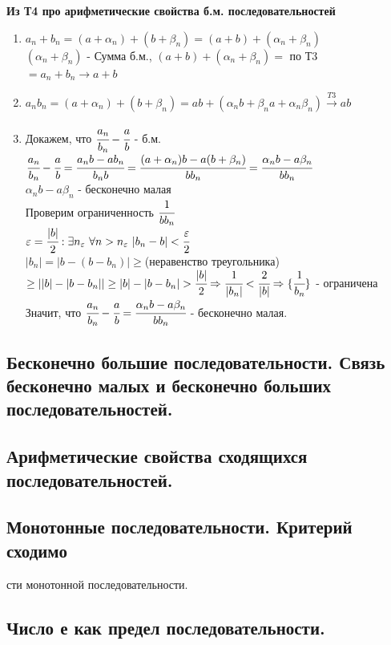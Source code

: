 \documentclass[12pt, a4paper]{article}
\newcommand{\eps}{\varepsilon}
\begin{document}
\begin{centering}
\begin{tcolorbox}[title=Доказательство Т5: Арифметические свойства предела, breakable]
\textbf{Из Т4 про арифметические свойства б.м. последовательностей}
\begin{enumerate}
    \item $a_n + b_n = (a + \alpha_n) + (b+\beta_n) = (a+b)+(\alpha_n+\beta_n)$\\
    $(\alpha_n+\beta_n)$ - Сумма б.м., $(a+b)+(\alpha_n+\beta_n) = $ по Т3 $= a_n+b_n \rightarrow a + b$
    \item $a_nb_n = (a + \alpha_n) + (b + \beta_n) = ab + (\alpha_nb + \beta_na + \alpha_n\beta_n) \xrightarrow[]{T3} ab$
    \item Докажем, что $\cfrac{a_n}{b_n} - \cfrac{a}{b}$ - б.м.\\
    $\cfrac{a_n}{b_n} - \cfrac{a}{b} = \cfrac{a_nb-ab_n}{b_nb} = \cfrac{(a+\alpha_n)b-a(b+\beta_n)}{bb_n} = \cfrac{\alpha_nb-a\beta_n}{bb_n}$\\
    $\alpha_nb-a\beta_n$ - бесконечно малая\\
    Проверим ограниченность $\cfrac{1}{bb_n}$\\
    $\eps=\cfrac{|b|}{2}: \exists n_\eps\ \forall n>n_\eps\ |b_n-b|<\cfrac{\eps}{2}$\\
    $|b_n| = |b-(b-b_n)| \geq{}$(неравенство треугольника)$\geq ||b|-|b-b_n||\geq|b|-|b-b_n|>\cfrac{|b|}{2}\Rightarrow\cfrac{1}{|b_n|}<\cfrac{2}{|b|} \Rightarrow \{\cfrac{1}{b_n}\}$ - ограничена\\
    Значит, что $\cfrac{a_n}{b_n} - \cfrac{a}{b} = \cfrac{\alpha_nb-a\beta_n}{bb_n}$ - бесконечно малая.
\end{enumerate}
\end{tcolorbox}

\subsection{Бесконечно большие последовательности. Связь бесконечно малых и бесконечно больших последовательностей.}
\subsection{Арифметические свойства сходящихся последовательностей.}
\subsection{Монотонные последовательности. Критерий сходимо}сти монотонной последовательности.
\subsection{Число е как предел последовательности.}


\end{centering}
\end{document}

